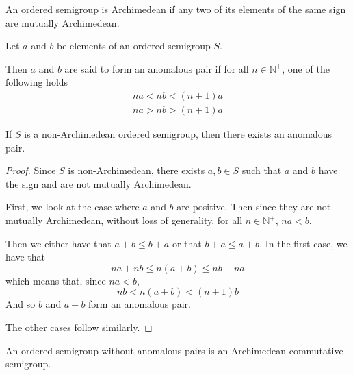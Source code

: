 \begin{definition}
An ordered semigroup is Archimedean if any two of its elements
of the same sign are mutually Archimedean.
\end{definition}

\begin{definition}
Let $a$ and $b$ be elements of an ordered semigroup $S$.

Then $a$ and $b$ are said to form an anomalous pair
if for all $n\in \mathbb{N}^+$, one of the following holds
\begin{align}
na < nb < (n+1)a \\
na > nb > (n+1)a
\end{align}
\end{definition}

\begin{theorem}
If $S$ is a non-Archimedean ordered semigroup, then there exists an anomalous pair.
\end{theorem}
\begin{proof}
Since $S$ is non-Archimedean, there exists $a,b\in S$ such that
$a$ and $b$ have the sign and are not mutually Archimedean.

First, we look at the case where $a$ and $b$ are positive.
Then since they are not mutually Archimedean, without loss of generality, for all $n\in \mathbb{N}^+$,
$na < b$.

Then we either have that $a + b \le b + a$ or that $b+a\le a + b$.
In the first case, we have that
\[
na + nb \le n(a+b) \le nb + na
\]
which means that, since $na < b$,
\[
nb < n(a+b) < (n+1)b
\]
And so $b$ and $a+b$ form an anomalous pair.

The other cases follow similarly.
\end{proof}

\begin{theorem}
An ordered semigroup without anomalous pairs is an Archimedean commutative semigroup.
\end{theorem}